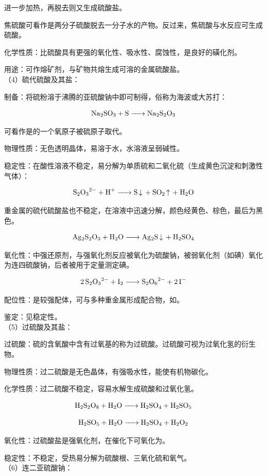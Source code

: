 \documentclass[a4paper,UTF8]{article}
\begin{document}
进一步加热，再脱去则又生成硫酸盐。

焦硫酸可看作是两分子硫酸脱去一分子水的产物。反过来，焦硫酸与水反应可生成硫酸。

化学性质：比硫酸具有更强的氧化性、吸水性、腐蚀性，是良好的磺化剂。

用途：可作熔矿剂，与矿物共熔生成可溶的金属硫酸盐。\\

（4）硫代硫酸及其盐：

制备：将硫粉溶于沸腾的亚硫酸钠中即可制得，俗称为海波或大苏打：

$$ \ce{Na2SO3 + S -> Na2S2O3} $$

可看作是的一个氧原子被硫原子取代。

物理性质：无色透明晶体，易溶于水，水溶液呈弱碱性。

稳定性：在酸性溶液不稳定，易分解为单质硫和二氧化硫（生成黄色沉淀和刺激性气体）：

$$ \ce{S2O3^2- + H+ -> S v + SO2 ^ + H2O} $$

重金属的硫代硫酸盐也不稳定，在溶液中迅速分解，颜色经黄色、棕色，最后为黑色。

$$ \ce{Ag2S2O3 + H2O -> Ag2S v + H2SO4} $$

氧化性：中强还原剂，与强氧化剂反应被氧化为硫酸钠，被弱氧化剂（如碘）氧化为连四硫酸钠，后者被用于定量测定碘。

$$ \ce{2S2O3^2- + I2 -> S2O6^2- + 2I-} $$

配位性：是较强配体，可与多种重金属形成配合物，如。

鉴定：见稳定性。\\

（5）过硫酸及其盐：

过硫酸：硫的含氧酸中含有过氧基的称为过硫酸。过硫酸可视为过氧化氢的衍生物。

物理性质：过二硫酸是无色晶体，有强吸水性，能使有机物碳化。

化学性质：过二硫酸不稳定，容易水解生成硫酸和过氧化氢。

$$ \ce{H2S2O8 + H2O -> H2SO4 + H2SO5} $$

$$ \ce{H2SO5 + H2O -> H2SO4 + H2O2} $$

氧化性：过硫酸盐是强氧化剂，在催化下可氧化为。

稳定性：不稳定，受热易分解为硫酸根、三氧化硫和氧气。\\

（6）连二亚硫酸钠：
\end{document}

